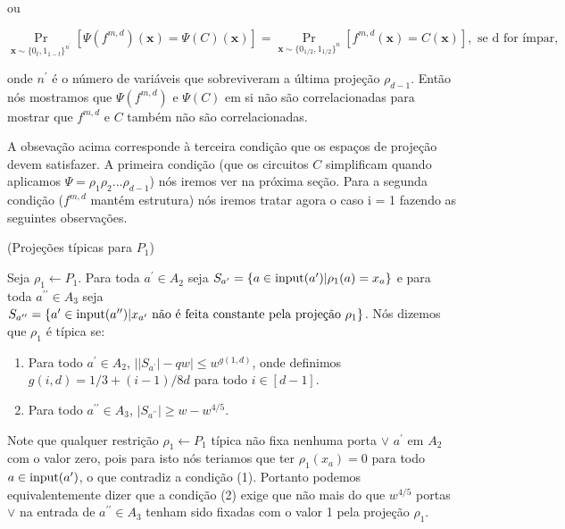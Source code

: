 ou

\begin{equation} \label{uniform_comp_eq_2}
	\Pr_{\textbf{x} \sim \{0_{t}, 1_{1 - t}\}^{n^{\prime}}}[ \Psi(f^{m, d})(\textbf{x}) = \Psi(C)(\textbf{x})] = \Pr_{\textbf{x} \sim \{0_{1/2}, 1_{1/2}\}^{n}}[f^{m, d}(\textbf{x}) = C(\textbf{x})], \text{ se d for ímpar},
\end{equation}

onde $n^{\prime}$ é o número de variáveis que sobreviveram a última projeção $\rho_{d - 1}$. Então nós mostramos que $\Psi(f^{m, d})$ e $\Psi(C)$ em si não são correlacionadas para mostrar que $f^{m, d}$ e $C$ também não são correlacionadas.

A obsevação acima corresponde à terceira condição que os espaços de projeção devem satisfazer. A primeira condição (que os circuitos $C$ simplificam quando aplicamos $\Psi = \rho_{1}\rho_{2}\dots\rho_{d - 1}$) nós iremos ver na próxima seção. Para a segunda condição ($f^{m, d}$ mantém estrutura) nós iremos tratar agora o caso i = 1 fazendo as seguintes observações.

\begin{defi} (Projeções típicas para $P_{1}$) \label{typical_proj_P1}

Seja $\rho_{1} \leftarrow P_{1}$. Para toda $a^{\prime} \in A_{2}$ seja $S_{a^{\prime}} = \{a \in \text{input}(a^{\prime}) \lvert \rho_{1}(a) = x_{a} \}$ e para toda $a^{\prime \prime} \in A_{3}$ seja $S_{a^{\prime \prime}} = \{a^{\prime} \in \text{input}(a^{\prime \prime}) \lvert x_{a^{\prime}} \text{ não é feita constante pela projeção } \rho_{1}\}$. Nós dizemos que $\rho_{1}$ é típica se:

\begin{enumerate}

	\item Para todo $a^{\prime} \in A_{2}$, $\big\lvert \lvert S_{a^{\prime}} \rvert - qw \big\rvert \leq w^{g(1, d)}$, onde definimos $g(i, d) = 1/3 + (i - 1)/8d$ para todo $i \in [d - 1]$.
	
	\item Para todo $a^{\prime \prime} \in A_{3}$, $\lvert S_{a^{\prime \prime}} \rvert \geq w - w^{4/5}$.

\end{enumerate}

Note que qualquer restrição $\rho_{1} \leftarrow P_{1}$ típica não fixa nenhuma porta $\lor$ $a^{\prime}$ em $A_{2}$ com o valor zero, pois para isto nós teriamos que ter $\rho_{1}(x_{a}) = 0$ para todo $a \in \text{input}(a^{\prime})$, o que contradiz a condição (1). Portanto podemos equivalentemente dizer que a condição (2) exige que não mais do que $w^{4/5}$ portas $\lor$ na entrada de $a^{\prime \prime} \in A_{3}$ tenham sido fixadas com o valor 1 pela projeção $\rho_{1}$.

\end{defi}

